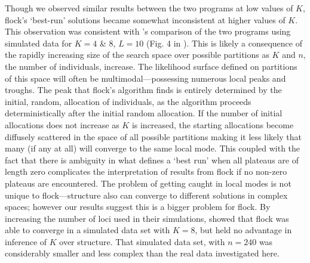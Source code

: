 Though we observed similar results
between the two programs at low values of $K$, {\sc flock}'s `best-run' solutions became somewhat inconsistent at higher values of $K$.
This observation was consistent with \citet{Duc&Tur2012}'s comparison of the 
two programs using simulated data 
for $K=4$ \& 8, $L=10$ (Fig. 4 in \citet{Duc&Tur2012}). 
This is likely a consequence of the rapidly increasing size of the search space over possible 
partitions as $K$ and $n$, the number of individuals, increase. 
The likelihood surface defined on partitions of this space will often
be multimodal---possessing numerous local peaks and troughs.
The peak that  {\sc flock}'s algorithm finds is entirely determined by the initial, random, allocation of 
individuals, as the algorithm proceeds deterministically after the initial random allocation.
If the number of initial allocations does not increase
as $K$ is increased, the starting allocations become diffusely scattered in the space of all
possible partitions making it less likely that many (if any at all) will converge to the same local mode. 
This coupled with the fact that there is 
ambiguity in what defines a `best run' when all plateaus are of length zero complicates the interpretation
of results from {\sc flock} if no non-zero plateaus are encountered. The problem of getting 
caught in local modes is not unique to {\sc flock}---{\sc structure} also can converge to 
different solutions in complex spaces; however our results suggest this is a bigger problem for {\sc flock}.
By increasing the number of loci used in their simulations, \citet{Duc&Tur2012} showed  that 
{\sc flock} was able to converge in a simulated data set with $K=8$, but held no advantage in inference of $K$ 
over {\sc structure}. That simulated data set, with $n=240$ was considerably smaller and less complex than the real data investigated here.

